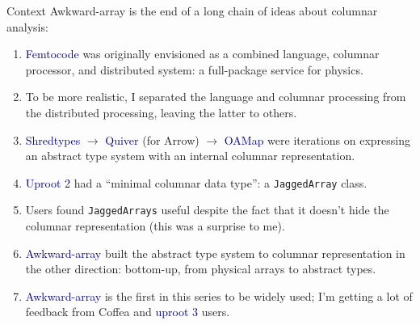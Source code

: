 \documentclass[aspectratio=169]{beamer}
\begin{document}
\begin{frame}{Context}
\large
\vspace{0.35 cm}
Awkward-array is the end of a long chain of ideas about columnar analysis:

\vspace{0.25 cm}
\begin{enumerate}
  \item \textcolor{darkblue}{Femtocode} was originally envisioned as a combined language, columnar processor, and distributed system: a full-package service for physics.
  \item To be more realistic, I separated the language and columnar processing from the distributed processing, leaving the latter to others.
  \item \textcolor{darkblue}{Shredtypes} $\to$ \textcolor{darkblue}{Quiver} (for Arrow) $\to$ \textcolor{darkblue}{OAMap} were iterations on expressing an abstract type system with an internal columnar representation.
  \item \textcolor{darkblue}{Uproot 2} had a ``minimal columnar data type'': a {\tt JaggedArray} class.
  \item Users found {\tt JaggedArrays} useful despite the fact that it doesn't hide the columnar representation (this was a surprise to me).
  \item \textcolor{darkblue}{Awkward-array} built the abstract type system to columnar representation in the other direction: bottom-up, from physical arrays to abstract types.
  \item \textcolor{darkblue}{Awkward-array} is the first in this series to be widely used; I'm getting a lot of feedback from Coffea and \textcolor{darkblue}{uproot 3} users.
\end{enumerate}
\end{frame}
\end{document}
